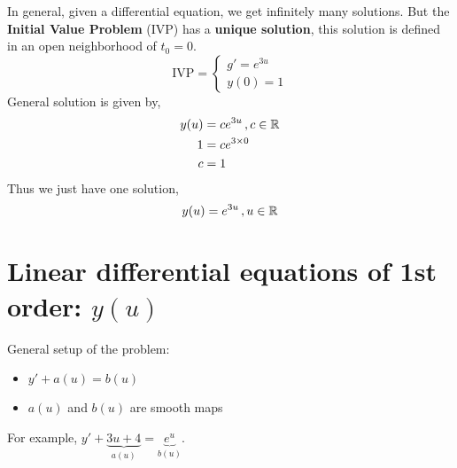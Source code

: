 In general, given a differential equation, we get infinitely many solutions. 
But the \textbf{Initial Value Problem} (IVP) has a \textbf{unique solution}, this solution is defined in an open neighborhood of $t_0=0$.
    \begin{equation*}\text{IVP} =
        \begin{cases*}
            g' = e^{3u}\\
            y(0) = 1
        \end{cases*}
    \end{equation*}
    General solution is given by,
    \begin{align*}
        y(u) & = ce^{3u}\, ,c\in\mathbb{R}\\
        1 & = ce^{3\times 0}\\
        c & = 1
    \end{align*}
    Thus we just have one solution,
    \begin{equation*}
        y(u) = e^{3u}\, ,u\in\mathbb{R}
    \end{equation*}

\section{Linear differential equations of 1st order: $y(u)$}
General setup of the problem:
\begin{itemize}
    \item $y'+a(u) = b(u)$
    \item $a(u)$ and $b(u)$ are smooth maps
\end{itemize}
For example, $y'+\underbrace{3u+4}_{a(u)} = \underbrace{e^u}_{b(u)}$.\\

